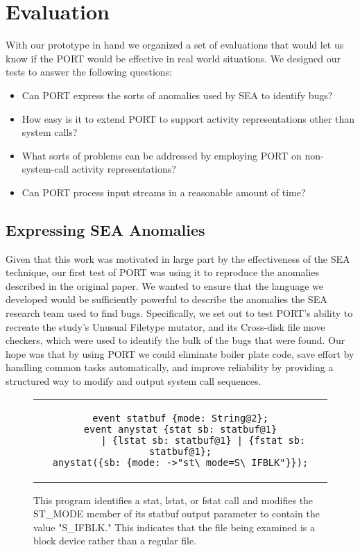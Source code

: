 \section{Evaluation}
\label{SEC:evaluation}

With our prototype in hand we organized a set of
evaluations that would let us know if the PORT would be effective
in real world situations.
We designed our tests to answer the following questions:

\begin{itemize}

  \item{Can PORT express the sorts of anomalies used by SEA to identify
    bugs?}

  \item{How easy is it to extend PORT to support activity representations
    other than system calls?}

  \item{What sorts of problems can be addressed by employing PORT on
  non-system-call activity representations?}

  \item{Can PORT process input streams in a reasonable amount of time?}

\end{itemize}


\subsection{Expressing SEA Anomalies}
\label{sub:SEAAnomalies}
Given that this work was motivated
in large part
by the effectiveness of the SEA technique,
our first test of PORT was using it to reproduce the anomalies described
in the original paper.
We wanted to ensure that
the language we developed
would be sufficiently powerful
to describe the anomalies the
SEA research team used to
find bugs.
Specifically,
we set out to test PORT's ability to recreate
the study's Unusual Filetype mutator,
and its Cross-disk file move checkers, which were used to identify
the bulk of
the bugs that were found.
Our hope was that by using PORT we could eliminate boiler plate code,
save effort by handling common tasks automatically, and improve reliability
by providing a structured way to modify and output system call sequences.

\begin{figure}[H]
\centering
\begin{tabular}{c}
\begin{lstlisting}
event statbuf {mode: String@2};
event anystat {stat sb: statbuf@1}
        | {lstat sb: statbuf@1} | {fstat sb: statbuf@1};
anystat({sb: {mode: ->"st\_mode=S\_IFBLK"}});
\end{lstlisting}
\end{tabular}
\caption{This program identifies a stat, lstat, or fstat call and modifies
  the ST\_MODE member of its statbuf output parameter to contain the value
  "S\_IFBLK."  This indicates that the file being examined is a block device
  rather than a regular file.}
\label{lst:UnusualFiletypePORT}
\end{figure}

